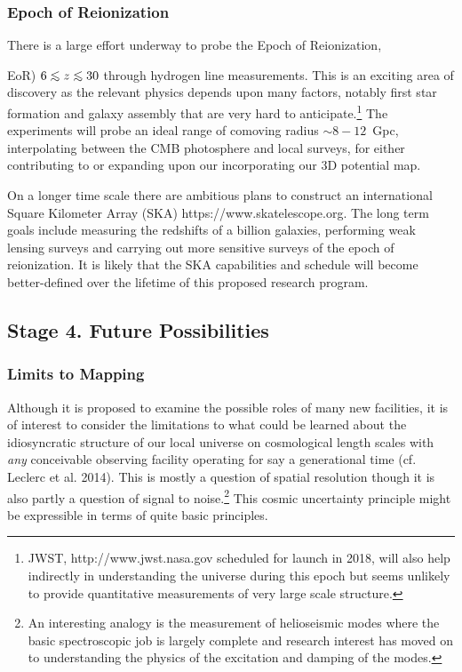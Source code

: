 \documentclass[psfig,11pt]{article}
\def\lo{\mathrel{\raise.3ex\hbox{$<$}\mkern-14mu\lower0.6ex\hbox{$\sim$}}}
\begin{document}
\subsubsection{Epoch of Reionization}

There is a large effort underway to probe the Epoch of Reionization, {EoR) $6\lo z\lo30$ through hydrogen line measurements. This is an exciting area of discovery as the relevant physics depends upon many factors, notably first star formation and galaxy assembly that are very hard to anticipate.\footnote{JWST, http://www.jwst.nasa.gov scheduled for launch in 2018, will also help indirectly in understanding the universe during this epoch but seems unlikely to provide quantitative measurements of very large scale structure.} The experiments will probe an ideal range of comoving radius $\sim8-12$~Gpc, interpolating between the CMB photosphere and local surveys,  for either contributing to or expanding upon our incorporating our 3D potential map.

On a longer time scale there are ambitious plans to construct an international Square Kilometer Array (SKA) https://www.skatelescope.org. The long term goals include measuring the redshifts of a billion galaxies, performing weak lensing surveys and carrying out more sensitive surveys of the epoch of reionization. It is likely that the SKA capabilities and schedule will become better-defined over the lifetime of this proposed research program.

\subsection{Stage 4. Future Possibilities}

\subsubsection{Limits to Mapping}

Although it is proposed to examine the possible roles of many new facilities, it is of interest to consider the limitations to what could be learned about the idiosyncratic structure of our local universe on cosmological length scales with {\it any} conceivable observing facility operating for say a generational time (cf. Leclerc et al. 2014). This is mostly a question of spatial resolution though it is also partly a question of signal to noise.\footnote{An interesting analogy is the measurement of helioseismic modes where the basic spectroscopic job is largely complete and research interest has moved on to understanding the physics of the excitation and damping of the modes.} This cosmic uncertainty principle might be expressible in terms of quite basic principles.

}
\end{document}
